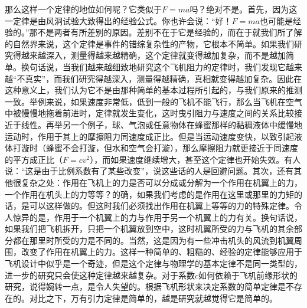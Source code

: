 那么这样一个定律的地位如何呢？它类似于$F=ma$吗？绝对不是。首先，因为这一定律是由风洞试验大致得出的经验公式。你也许会说：“好！$F=ma$也可能是经验的。”那不是两者有所差别的原因。差别不在于它是经验的，而在于就我们所了解的自然界来说，这个定律是事件的错综复杂性的产物，它根本不简单。如果我们研究得越来越深入，测量得越来越精确，这个定律就变得越加复杂，而不是越加简单。换句话说，当我们越来越细致地研究这个飞机阻力的定律时，我们发现它越来越“不真实”，而我们研究得越深入，测量得越精确，真相就变得越加复杂。因此在这种意义上，我们认为它不是由那种简单的基本过程所引起的，与我们原来的推测一致。举例来说，如果速度非常低，低到一般的飞机不能飞行，那么当飞机在空气中被慢慢地拖着前进时，定律就发生变化，这时曳引阻力与速度之间的关系比较接近于线性。再举另一个例子，球、气泡或任意物体在蜂蜜那样的黏稠液体中缓慢地运动时，作用于其上的摩擦阻力同速度成正比。但是当运动速度变快，以致引起液体打漩时（蜂蜜不会打漩，但水和空气会打漩），那么摩擦阻力就更接近于同速度的平方成正比（$F=cv^2$），而如果速度继续增大，甚至这个定律也开始失效。有人说：“这是由于比例系数有了某些改变”，说这些话的人是回避问题。其次，还有其他很复杂之处：作用在飞机上的力是否可以分成或分解为一个作用在机翼上的力，一个作用在机头上的力等等？的确，如果我们考虑的是作用在这里或那里的力矩的话，是可以这样做的。但这时我们必须找出作用在机翼上等等的力的特殊定律。令人惊异的是，作用于一个机翼上的力与作用于另一个机翼上的力有关。换句话说，如果我们把飞机拆开，只把一个机翼放到空中，这时机翼所受的力与飞机的其余部分都在那里时所受的力是不同的。当然，这是因为有一些冲击机头的风流到机翼周围，改变了作用在机翼上的力。这样一种简单的、粗糙的、经验的定律能够应用于飞机设计中似乎是一个奇迹，但是这个定律与物理学的基本定律不是同一类型的，进一步的研究只会使这种定律越来越复杂。对于系数$c$如何依赖于飞机前缘形状的研究，说得婉转一点，是令人失望的。根据飞机形状来决定系数的简单定律是不存在的。对比之下，万有引力定律是简单的，越是研究就越觉得它是简单的。

